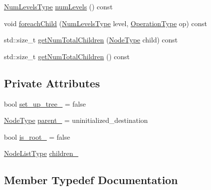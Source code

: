 \begin{DoxyCompactItemize}
\item 
\hyperlink{structvt_1_1collective_1_1tree_1_1_tree_af64acc9543dc1bd1b56d6ed17b003425}{Num\+Levels\+Type} \hyperlink{structvt_1_1collective_1_1tree_1_1_tree_a56532f6b47b9c71864980b73deee2d5a}{num\+Levels} () const
\item 
void \hyperlink{structvt_1_1collective_1_1tree_1_1_tree_a8200f03bf19b18b2323d1fcb99d5335f}{foreach\+Child} (\hyperlink{structvt_1_1collective_1_1tree_1_1_tree_af64acc9543dc1bd1b56d6ed17b003425}{Num\+Levels\+Type} level, \hyperlink{structvt_1_1collective_1_1tree_1_1_tree_a5ce4242e9580c807baa74168401f381a}{Operation\+Type} op) const
\item 
std\+::size\+\_\+t \hyperlink{structvt_1_1collective_1_1tree_1_1_tree_ac387d211dbc2689a216a3b99bc332507}{get\+Num\+Total\+Children} (\hyperlink{namespacevt_a866da9d0efc19c0a1ce79e9e492f47e2}{Node\+Type} child) const
\item 
std\+::size\+\_\+t \hyperlink{structvt_1_1collective_1_1tree_1_1_tree_a294b7827285c140d412a4344f3b135d5}{get\+Num\+Total\+Children} () const
\end{DoxyCompactItemize}
\subsection*{Private Attributes}
\begin{DoxyCompactItemize}
\item 
bool \hyperlink{structvt_1_1collective_1_1tree_1_1_tree_af240b20228198eae21c33e1b6a042fe2}{set\+\_\+up\+\_\+tree\+\_\+} = false
\item 
\hyperlink{namespacevt_a866da9d0efc19c0a1ce79e9e492f47e2}{Node\+Type} \hyperlink{structvt_1_1collective_1_1tree_1_1_tree_a9984c66b641a7a3ea9db6afc686739b0}{parent\+\_\+} = uninitialized\+\_\+destination
\item 
bool \hyperlink{structvt_1_1collective_1_1tree_1_1_tree_abe6e5a200fc08f3dc040bd134e97d8f2}{is\+\_\+root\+\_\+} = false
\item 
\hyperlink{structvt_1_1collective_1_1tree_1_1_tree_a834e7b54ea2dceae42db7c5ea859753f}{Node\+List\+Type} \hyperlink{structvt_1_1collective_1_1tree_1_1_tree_ad4485d4ba90addf6bd7e25425d4cf6dd}{children\+\_\+}
\end{DoxyCompactItemize}


\subsection{Member Typedef Documentation}
\mbox{\label{structvt_1_1collective_1_1tree_1_1_tree_a834e7b54ea2dceae42db7c5ea859753f}} 
